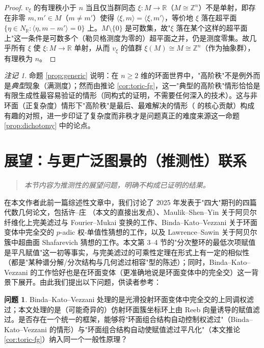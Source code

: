 \documentclass[11pt,a4paper]{article}
\theoremstyle{definition}
\newtheorem{question}[theorem]{问题}
\theoremstyle{remark}
\newtheorem{remark}[theorem]{注记}
\newcommand{\Z}{\mathbb{Z}}
\newcommand{\R}{\mathbb{R}}
\begin{document}
\begin{proof}
$v_\xi$ 的有理秩小于 $n$ 当且仅当群同态 $\xi:M\to\R$（$M\cong\Z^n$）不是单射，即存在非零 $m,m'\in M$（$m\ne m'$）使得 $\langle\xi,m\rangle=\langle\xi,m'\rangle$，等价地 $\xi$ 落在超平面 $\{\eta\in N_\R:\langle\eta,m-m'\rangle=0\}$ 上。$M\setminus\{0\}$ 是可数集，故"$\xi$ 落在某个这样的超平面上"这一条件是可数多个（勒贝格测度为零的）超平面之并，仍是测度零集。故几乎所有 $\xi$ 使 $\xi:M\to\R$ 单射，从而 $v_\xi$ 的值群 $\xi(M)\cong M\cong\Z^n$（作为抽象群），有理秩为 $n$。
\end{proof}

\begin{remark}
命题 \ref{prop:generic} 说明：在 $n\ge2$ 维的环面世界中，"高阶秩"不是例外而是\emph{典型}现象（满测度）；然而由推论 \ref{cor:toric-fg}，这一"典型的高阶秩"情形恰恰是有限生成性最容易验证的情形（同构式的证明，不需要任何深入的技术）。这与非环面（正复杂度）情形下"高阶秩"是最后、最难解决的情形（\cite{XZ2025} 的核心贡献）构成有趣的对照，进一步印证了复杂度而非秩才是问题真正的难度来源这一命题 \ref{prop:dichotomy} 中的论点。
\end{remark}

\section{展望：与更广泛图景的（推测性）联系}

\begin{quote}
\emph{本节内容为推测性的展望问题，明确不构成已证明的结果。}
\end{quote}

在本文作者此前一篇综述性文章中，我们讨论了 2025 年发表于"四大"期刊的四篇代数几何论文，包括许--庄 \cite{XZ2025}（本文的直接出发点）、Maulik--Shen--Yin 关于阿贝尔纤维化上完美滤过与 Fourier--Mukai 变换的工作、Binda--Kato--Vezzani 关于环面变体中完全交的 $p$-adic 权-单值性猜想的工作，以及 Lawrence--Sawin 关于阿贝尔簇中超曲面 Shafarevich 猜想的工作。本文第 3--4 节的"分次整环的最低次项赋值是平凡赋值"这一初等事实，与完美滤过的可乘性定理在形式上有一定的相似性（都是"某种谱分解/分次结构与几何滤过相容"型的陈述）；同时，Binda--Kato--Vezzani 的工作恰好也是在环面变体（更准确地说是环面变体中的完全交）这一背景下展开。由此我们提出以下问题，供读者参考：

\begin{question}
Binda--Kato--Vezzani \cite{BKV2025} 处理的是光滑投射环面变体中完全交的上同调权滤过；本文处理的是（可能奇异的）仿射环面簇坐标环上由 Reeb 向量诱导的赋值滤过。是否存在一个统一的框架，能够将"环面组合结构自动控制权滤过"（Binda--Kato--Vezzani 的情形）与"环面组合结构自动使赋值滤过平凡化"（本文推论 \ref{cor:toric-fg}）纳入同一个一般性原理？
\end{question}
\end{document}
